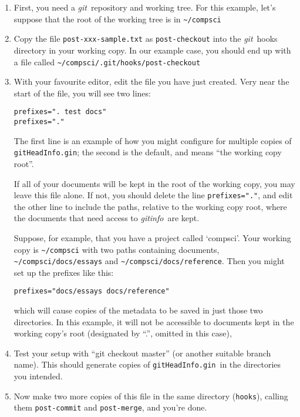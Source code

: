 \documentclass[a4paper,12pt,twoside,openany]{memoir}
\newcommand{\sfit}[1]{\textit{#1}}
\newcommand{\git}{\sfit{git}}
\newcommand{\tpname}{\sfit{gitinfo}}
\newcommand{\ginname}{gitHeadInfo.gin}
\newcommand{\metaname}{\texttt{\ginname}}
\begin{document}
\begin{enumerate}

\item First, you need a \git\ repository and working tree.
For this example, let's suppose that the root of the working tree is in
\texttt{\textasciitilde/compsci}

\item Copy the file \texttt{post-xxx-sample.txt} as \texttt{post-checkout}
into the \git\ hooks directory in your working copy.
In our example case, you should end up with a file called
\texttt{\textasciitilde/compsci/.git/hooks/post-checkout}

\item With your favourite editor, edit the file you have just created.
Very near the start of the file, you will see two lines:
\vspace{0.5\baselineskip}

\noindent\texttt{prefixes=". test docs"\\
prefixes="."} 
\vspace{0.5\baselineskip}

The first line is an example of how you might configure for multiple
copies of \metaname; the second is the default,
and means ``the working copy root''.

If all of your documents will be kept in the root of the working copy,
you may leave this file alone.
If not, you should delete the line \verb!prefixes="."!, and edit
the other line to include the paths, relative to the working copy root,
where the documents that need access to \tpname\ are kept.

Suppose, for example, that you have a project called `compsci'.
Your working copy is \texttt{\textasciitilde/compsci}
with two paths containing documents,
\texttt{\textasciitilde/compsci/docs/essays} and
\texttt{\textasciitilde/compsci/docs/reference}.
Then you might set up the prefixes like this:
\vspace{0.5\baselineskip}

\noindent\texttt{prefixes="docs/essays docs/reference"}
\vspace{0.5\baselineskip}

which will cause copies of the metadata to be saved in
just those two directories.
In this example, it will not be accessible to documents
kept in the working copy's root
(designated by ``.'', omitted in this case),

\item Test your setup with ``git checkout master''
(or another suitable branch name).
This should generate copies of \metaname\ in the directories
you intended.

\item Now make two more copies of this file in the same directory (\texttt{hooks}), calling them
\texttt{post-commit} and \texttt{post-merge}, and you're done.
\end{enumerate}
\end{document}
